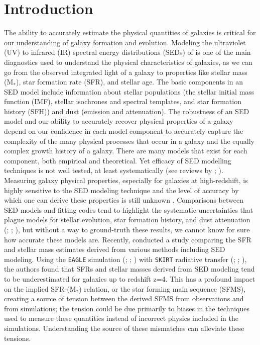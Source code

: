 \documentclass[twocolumn]{aastex62}
\begin{document}
\section{Introduction} \label{sec:intro}

The ability to accurately estimate the physical quantities of galaxies is critical for our understanding of galaxy formation and evolution. Modeling the ultraviolet (UV) to infrared (IR) spectral energy distributions (SEDs) of is one of the main diagnostics used to understand the physical characteristics of galaxies, as we can go from the observed integrated light of a galaxy to properties like stellar mass (M$_*$), star formation rate (SFR), and stellar age. The basic components in an SED model include information about stellar populations (the stellar initial mass function (IMF), stellar isochrones and spectral templates, and star formation history (SFH)) and dust (emission and attenuation). The robustness of an SED model and our ability to accurately
recover physical properties of a galaxy depend on our confidence in each model component to accurately capture the complexity of the many physical processes that occur in a galaxy and the equally complex growth history of a galaxy. There are many models that exist for each component, both empirical and theoretical. Yet efficacy of SED modelling techniques is not well tested, at least systematically (see reviews by \cite{conroy_modeling_2013}; \cite{walcher_fitting_2011}). Measuring galaxy physical properties, especially for galaxies at high-redshift, is highly sensitive to the SED modeling technique and the level of accuracy by which one can derive these properties is still unknown \citep{hayward_should_2015}. Comparisons between SED models and fitting codes tend to highlight the systematic uncertainties that plague models for stellar evolution, star formation history, and dust attenuation (\cite{hunt_comprehensive_2019}; \cite{mitchell_how_2013}; \cite{pforr_recovering_2012}), but without a way to ground-truth these results, we cannot know for sure how accurate these models are. Recently, \cite{katsianis_high_2020} conducted a study comparing the SFR and stellar mass estimates derived from various methods including SED modeling. Using the \texttt{EAGLE} simulation (\cite{schaye_eagle_2015}; \cite{crain_eagle_2015}; \cite{mcalpine_eagle_2016}) with \texttt{SKIRT} radiative transfer (\cite{baes_radiative_2003}; \cite{baes_efficient_2011}; \cite{camps_skirt_2015}), the authors found that SFRs and stellar masses derived from SED modeling tend to be underestimated for galaxies up to redshift z=4. This has a profound impact on the implied SFR-(M$_*$) relation, or the star forming main sequence (SFMS), creating a source of tension between the derived SFMS from observations and from simulations; the tension could be due primarily to biases in the techniques used to measure these quantities instead of incorrect physics included in the simulations. Understanding the source of these mismatches can alleviate these tensions. 
\end{document}
